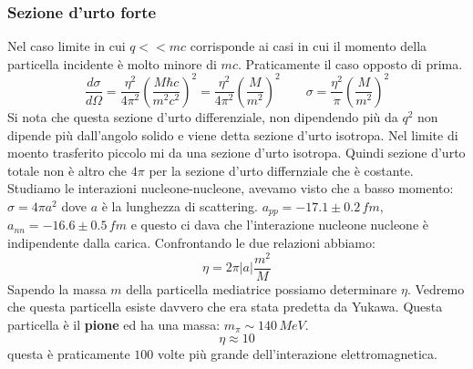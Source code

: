 \subsubsection{Sezione d'urto forte}
Nel caso limite in cui $q<<mc$ corrisponde ai casi in cui il momento della particella incidente è molto minore di $mc$. Praticamente il caso opposto di prima.
\begin{equation*}
    \frac{d\sigma}{d\Omega}=\frac{\eta^2}{4\pi^2}\left(\frac{M\hbar c}{m^2c^2}\right)^2=\frac{\eta^2}{4\pi^2}\left(\frac{M}{m^2}\right)^2 \qquad \sigma =\frac{\eta^2}{\pi}\left(\frac{M}{m^2}\right)^2
\end{equation*}
Si nota che questa sezione d'urto differenziale, non dipendendo più da $q^2$ non dipende più dall'angolo solido e viene detta sezione d'urto isotropa. Nel limite di moento trasferito piccolo mi da una sezione d'urto isotropa. Quindi sezione d'urto totale non è altro che $4\pi$ per la sezione d'urto differnziale che è costante. Studiamo le interazioni nucleone-nucleone, avevamo visto che a basso momento: $\sigma=4\pi a^2$ dove $a$ è la lunghezza di scattering. $a_{pp}=-17.1\pm0.2\,fm$, $a_{nn}=-16.6\pm0.5\,fm$ e questo ci dava che l'interazione nucleone nucleone è indipendente dalla carica. Confrontando le due relazioni abbiamo: 
\begin{equation*}
    \eta=2\pi|a|\frac{m^2}{M}
\end{equation*}
Sapendo la massa $m$ della particella mediatrice possiamo determinare $\eta$. Vedremo che questa particella esiste davvero che era stata predetta da Yukawa. Questa particella è il \textbf{pione} ed ha una massa: $m_\pi\sim140\,MeV$.
\begin{equation*}
    \eta\approx10
\end{equation*}
questa è praticamente $100$ volte più grande dell'interazione elettromagnetica.
